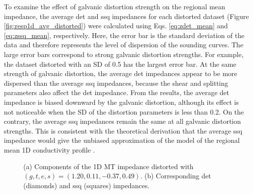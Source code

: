 	To examine the effect of galvanic distortion strength on the regional mean impedance, the average det and ssq impedances for each distorted dataset (Figure \ref{fig:resp1d_avg_distorted}) were calculated using Eqs. \eqref{eq:zdet_mean} and \eqref{eq:zssq_mean}, respectively. Here, the error bar is the standard deviation of the data and therefore represents the level of dispersion of the sounding curves. The large error bars correspond to strong galvanic distortion strengths. For example, the dataset distorted with an SD of 0.5 has the largest error bar. 
	At the same strength of galvanic distortion, the average det impedances appear to be more dispersed than the average ssq impedances, because the shear and splitting parameters also affect the det impedance. 
	From the results, the average det impedance is biased downward by the galvanic distortion, although its effect is not noticeable when the SD of the distortion parameters is less than 0.2.
	On the contrary, the average ssq impedances remain the same at all galvanic distortion strengths.
	This is consistent with the theoretical derivation that the average ssq impedance would give the unbiased approximation of the model of the regional mean 1D conductivity profile \citep{rung-arunwan2016a}.

	\begin{figure}[t]
		\centering
	\caption[Example of distorted 1D MT data and corresponding invariant impedances]{(a) Components of the 1D MT impedance distorted with $(g, t, e, s) = (1.20, 0.11, -0.37, 0.49)$. (b) Corresponding det (diamonds) and ssq (squares) impedances.}
	\label{fig:resp1d_example_distorted}
	\end{figure}
	
